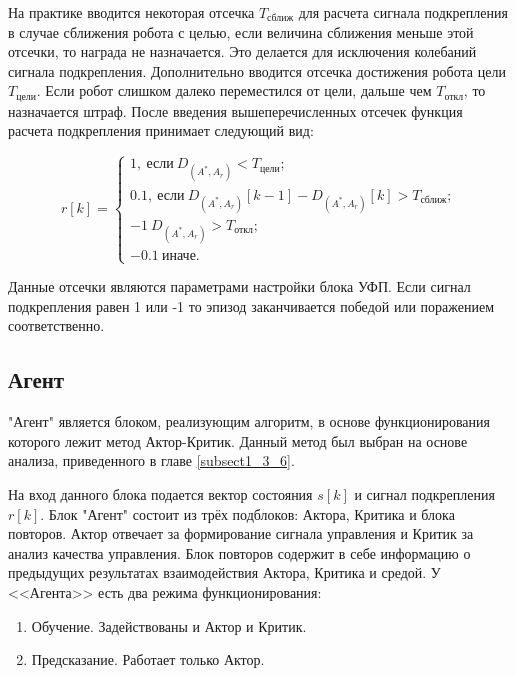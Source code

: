 На практике вводится некоторая отсечка $ T_{\text{сближ}} $ для расчета сигнала подкрепления в случае сближения робота с целью, если величина сближения  меньше этой отсечки, то награда не назначается. Это делается для исключения колебаний сигнала подкрепления. Дополнительно вводится отсечка достижения робота цели $ T_{\text{цели}} $. Если робот слишком далеко переместился от цели, дальше чем $ T_{\text{откл}} $, то назначается штраф. После введения вышеперечисленных отсечек функция расчета подкрепления принимает следующий вид:

$$
r[k] = \begin{cases}
1, \: \text{если} \: D_{(A^*, A_r)} < T_{\text{цели}}; \\
0.1, \: \text{если} \: D_{(A^*, A_r)}[k-1] - D_{(A^*, A_r)}[k] > T_{\text{сближ}}; \\
-1 \: D_{(A^*, A_r)} > T_{\text{откл}};\\
-0.1 \: \text{иначе}.
\end{cases}
$$

\noindent Данные отсечки являются параметрами настройки блока УФП. Если сигнал подкрепления равен 1 или -1 то эпизод заканчивается победой или поражением соответственно.

\subsection{Агент} \label{subsect2_2_4}
"Агент" является блоком, реализующим алгоритм, в основе функционирования которого лежит метод Актор-Критик. Данный метод был выбран на основе анализа, приведенного в главе \ref{subsect1_3_6}.

На вход данного блока подается вектор состояния $s[k]$ и сигнал подкрепления $r[k]$. Блок "Агент" состоит из трёх подблоков: Актора, Критика и блока повторов. Актор отвечает за формирование сигнала управления и Критик за анализ качества управления. Блок повторов содержит в себе информацию о предыдущих результатах взаимодействия Актора, Критика и средой. У <<Агента>> есть два режима функционирования:
\begin{enumerate}
	\item Обучение. Задействованы и Актор и Критик.
	\item Предсказание. Работает только Актор.
\end{enumerate} 

